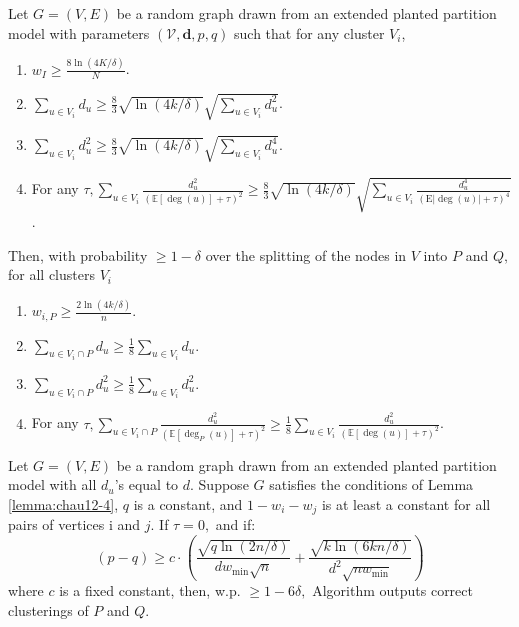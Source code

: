 {	\begin{lemma}\label{lemma:chau12-4}
		Let $G=(V, E)$ be a random graph drawn from an extended planted partition model with parameters $(\mathcal{V}, \boldsymbol{d}, p, q)$ such that for any cluster $V_{i}$,
		\begin{enumerate}
			\item $w_{I} \geq \frac{8 \ln (4 K / \delta)}{N}$.
			\item $\sum_{u \in V_{i}} d_{u} \geq \frac{8}{3} \sqrt{\ln (4 k / \delta)} \sqrt{\sum_{u \in V_{i}} d_{u}^{2}}$.
			\item $\sum_{u \in V_{i}} d_{u}^{2} \geq \frac{8}{3} \sqrt{\ln (4 k / \delta)} \sqrt{\sum_{u \in V_{i}} d_{u}^{4}}$.
			\item For any $\tau, \sum_{u \in V_{i}} \frac{d_{u}^{2}}{(\mathbb{E}[\operatorname{deg}(u)]+\tau)^{2}} \geq \frac{8}{3} \sqrt{\ln (4 k / \delta)} \sqrt{\sum_{u \in V_{i}} \frac{d_{u}^{4}}{(\mathrm{E}|\operatorname{deg}(u)|+\tau)^{4}}}$.
		\end{enumerate}
		Then, with probability $\geq 1-\delta$ over the splitting of the nodes in $V$ into $P$ and $Q,$ for all clusters $V_{i}$
		\begin{enumerate}
			\item $w_{i, P} \geq \frac{2 \ln (4 k / \delta)}{n}$.
			\item $\sum_{u \in V_{i} \cap P} d_{u} \geq \frac{1}{8} \sum_{u \in V_{i}} d_{u}$.
			\item $\sum_{u \in V_{i} \cap P} d_{u}^{2} \geq \frac{1}{8} \sum_{u \in V_{i}} d_{u}^{2}$.
			\item For any $\tau, \sum_{u \in V_{i} \cap P} \frac{d_{u}^{2}}{\left(\mathbb{E}\left[\operatorname{deg}_{P}(u)\right]+\tau\right)^{2}} \geq \frac{1}{8} \sum_{u \in V_{i}} \frac{d_{u}^{2}}{(\mathbb{E}[\operatorname{deg}(u)]+\tau)^{2}}$.
		\end{enumerate}
	\end{lemma}
	
	\begin{theorem}
		Let $G=(V, E)$ be a random graph drawn from an extended planted partition model with all $d_{u}$'s equal to $d$. Suppose $G$ satisfies the conditions of Lemma \ref{lemma:chau12-4}, $q$ is a constant, and $1-w_{i}-w_{j}$ is at least a constant for all pairs of vertices i and $j .$ If $\tau=0,$ and if:
		$$
		(p-q) \geq c \cdot\left(\frac{\sqrt{q \ln (2 n / \delta)}}{d w_{\min } \sqrt{n}}+\frac{\sqrt{k \ln (6 k n / \delta)}}{d^{2} \sqrt{n w_{\min }}}\right)
		$$
		where $c$ is a fixed constant, then, w.p. $\geq 1-6 \delta,$ Algorithm outputs correct clusterings of $P$ and $Q$.
	\end{theorem}
	
}
